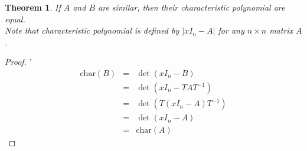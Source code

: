 \documentclass{article}
\theoremstyle{MyNonumberplain}
\theoremstyle{break}
\newtheorem*{proof}{Proof. }
\newcommand{\tmop}{\text}
\theoremstyle{break}
\newtheorem{theorem}{Theorem}[section]
\theoremstyle{break}
\theoremstyle{definition}
\theoremstyle{break}
\begin{document}
\begin{thmbox}
    \begin{theorem}
        If $A$ and $B$ are similar, then their characteristic polynomial are equal.\\

        Note that characteristic polynomial is defined by $| x I_n - A |$ for any $n
        \times n$ matrix $A$.
    \end{theorem}
    \begin{prfbox}
        \begin{proof}'
            \begin{eqnarray*}
                \tmop{char} (B) & = & \det (x I_n - B)\\
                & = & \det (x I_n - T A T^{- 1})\\
                & = & \det (T (x I_n - A) T^{- 1})\\
                & = & \det (x I_n - A)\\
                & = & \tmop{char} (A)
              \end{eqnarray*}
        \end{proof}
    \end{prfbox}
\end{thmbox}
\end{document}
